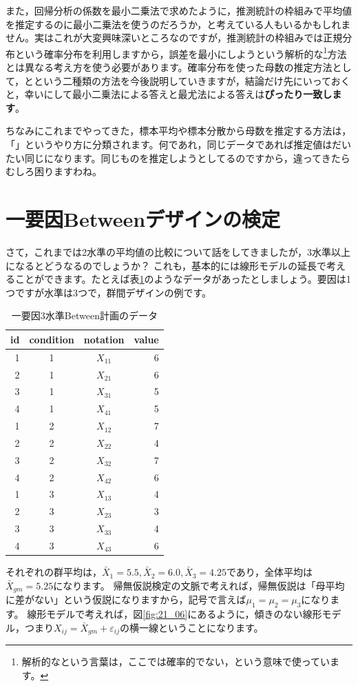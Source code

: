 \documentclass{ltjbook}
\begin{document}
また，回帰分析の係数を最小二乗法で求めたように，推測統計の枠組みで平均値を推定するのに最小二乗法を使うのだろうか，と考えている人もいるかもしれません。実はこれが大変興味深いところなのですが，推測統計の枠組みでは正規分布という確率分布を利用しますから，誤差を最小にしようという解析的な\footnote{解析的なという言葉は，ここでは確率的でない，という意味で使っています。}方法とは異なる考え方を使う必要があります。確率分布を使った母数の推定方法として，とという二種類の方法を今後説明していきますが，結論だけ先にいっておくと，幸いにして最小二乗法による答えと最尤法による答えは\textbf{ぴったり一致します}。

ちなみにこれまでやってきた，標本平均や標本分散から母数を推定する方法は，「」というやり方に分類されます。何であれ，同じデータであれば推定値はだいたい同じになります。同じものを推定しようとしてるのですから，違ってきたらむしろ困りますわね。

\section{一要因Betweenデザインの検定}
さて，これまでは2水準の平均値の比較について話をしてきましたが，3水準以上になるとどうなるのでしょうか？
これも，基本的には線形モデルの延長で考えることができます。たとえば表\ref{table::21_02}のようなデータがあったとしましょう。要因は1つですが水準は3つで，群間デザインの例です。
\begin{table}[ht]
	\centering
	\caption{一要因3水準Between計画のデータ}
	\begin{tabular}{rccr}
		\hline
		id & condition & notation & value \\
		\hline
		1  & 1         & $X_{11}$ & 6     \\
		2  & 1         & $X_{21}$ & 6     \\
		3  & 1         & $X_{31}$ & 5     \\
		4  & 1         & $X_{41}$ & 5     \\
		1  & 2         & $X_{12}$ & 7     \\
		2  & 2         & $X_{22}$ & 4     \\
		3  & 2         & $X_{32}$ & 7     \\
		4  & 2         & $X_{42}$ & 6     \\
		1  & 3         & $X_{13}$ & 4     \\
		2  & 3         & $X_{23}$ & 3     \\
		3  & 3         & $X_{33}$ & 4     \\
		4  & 3         & $X_{43}$ & 6     \\
		\hline
	\end{tabular}
	\label{table::21_02}
\end{table}
それぞれの群平均は，$\bar{X}_1 = 5.5,\bar{X}_2 = 6.0,\bar{X}_3 = 4.25$であり，全体平均は$\bar{X}_{gm}= 5.25$になります。
帰無仮説検定の文脈で考えれば，帰無仮説は「母平均に差がない」という仮説になりますから，記号で言えば$\mu_1 = \mu_2 = \mu_3$になります。
線形モデルで考えれば，図\ref{fig:21_06}にあるように，傾きのない線形モデル，つまり$X_{ij} = \bar{X}_{gm} + \varepsilon_{ij}$の横一線ということになります。
\end{document}
